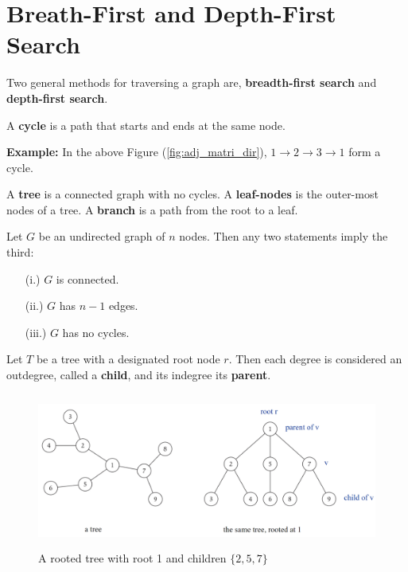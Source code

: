 \section{Breath-First and Depth-First Search}
Two general methods for traversing a graph are, \textbf{breadth-first search} and \textbf{depth-first search}.

\label{sec:bfs_dfs}
\begin{Def}[Cycle]

    A \textbf{cycle} is a path that starts and ends at the same node.
\end{Def}
\textbf{Example:} In the above Figure (\ref{fig:adj_matri_dir}), $1\rightarrow 2 \rightarrow 3 \rightarrow 1$ form a cycle.
\begin{Def}[Tree]

    A \textbf{tree} is a connected graph with no cycles. A \textbf{leaf-nodes} is the outer-most nodes of a tree. A \textbf{branch} is a path from the root to a leaf.  
\end{Def}
\newpage
\begin{theo}

    Let $G$ be an undirected graph of $n$ nodes. Then any two statements imply the third:
    \begin{enumerate}
        \item [(i.)] $G$ is connected.
        \item [(ii.)] $G$ has $n-1$ edges.
        \item [(iii.)] $G$ has no cycles.
    \end{enumerate}
\end{theo}

\begin{Def}
    
        Let $T$ be a tree with a designated root node $r$. Then each degree is 
        considered an outdegree, called a \textbf{child}, and its indegree its \textbf{parent}.
\end{Def}
\begin{figure}[h]
    \begin{center}
      \includegraphics[height=2in]{./Sections/graphs/rooted_tree.png}
    \end{center}
     \caption{A rooted tree with root 1 and children $\{2,5,7\}$}\label{fig:rooted_tree}
  \end{figure}

